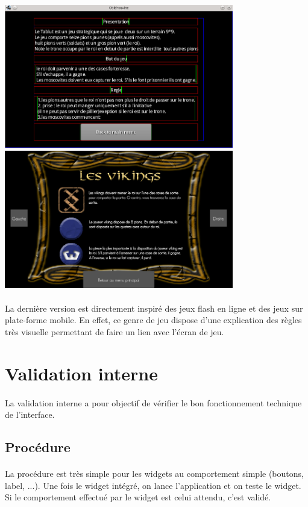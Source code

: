 \documentclass[11pt]{article} %
\begin{document}
\begin{center}
\includegraphics[width=10cm]{snapshot8.png}
\includegraphics[width=10cm]{validDoc4.jpg}
\end{center}
\paragraph{}
La dernière version est directement inspiré des jeux flash en ligne et des jeux sur plate-forme mobile. En effet, ce genre de jeu dispose d'une explication des règles très visuelle permettant de faire un lien avec l'écran de jeu.

\section{Validation interne}
\paragraph{}
La validation interne a pour objectif de vérifier le bon fonctionnement technique de l'interface.

\subsection{Procédure}
\paragraph{}
La procédure est très simple pour les widgets au comportement simple (boutons, label, ...). Une fois le widget intégré, on lance l'application et on teste le widget. Si le comportement effectué par le widget est celui attendu, c'est validé.
\end{document}
